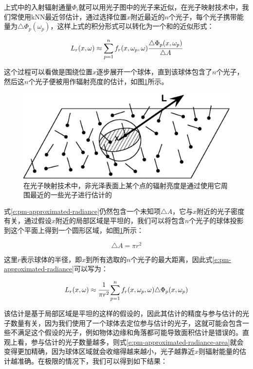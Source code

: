 上式中的入射辐射通量$\Phi_i$就可以用光子图中的光子来近似，在光子映射技术中，我们常使用kNN最近邻估计，通过选择位置$x$附近最近的$n$个光子，每个光子携带能量为$\triangle\Phi_p({\omega_p})$，这样上式的积分形式可以转化为一个和的近似形式：

\begin{equation}\label{e:pm-approximated-radiance}
	L_r(x,{\omega})\approx \sum^{n}_{p=1}f_r(x,{\omega}_p,{\omega}) \cfrac{\triangle\Phi_p(x,{\omega}_p)}{\triangle A}
\end{equation}

这个过程可以看做是围绕位置$x$逐步展开一个球体，直到该球体包含了$n$个光子，然后这$n$个光子便被用作辐射亮度的估计，如图\ref{f:pm-sphere-estimate}所示。

\begin{figure}
\sidecaption
	\includegraphics[width=.5\textwidth]{figures/pm/radiance-estimate}
	\caption{在光子映射技术中，非光泽表面上某个点的辐射亮度是通过使用它周围最近的一些光子进行估计的}
	\label{f:pm-sphere-estimate}
\end{figure}

式\ref{e:pm-approximated-radiance}仍然包含一个未知项$\triangle A$，它与$x$附近的光子密度有关，通过假设$x$附近的局部区域是平坦的，我们可以将包含$n$个光子的球体投影到这个平面上得到一个圆形区域，如图\ref{f:pm-sphere-estimate}所示：

\begin{equation}
	\triangle A=\pi r^{2}
\end{equation}

\noindent 这里$r$表示球体的半径，即$x$到所有选取的$n$个光子的最大距离，因此式\ref{e:pm-approximated-radiance}可以写为：

\begin{equation}\label{e:pm-approximated-radiance-area}
	L_r(x,{\omega})\approx  \cfrac{1}{\pi r^{2}}\sum^{n}_{p=1}f_r(x,{\omega}_p,{\omega})\triangle\Phi_p(x,{\omega}_p)
\end{equation}
 
该估计是基于局部区域是平坦的这样的假设的，因此其估计的精度与参与估计的光子数量有关，因为我们使用了一个球体去定位参与估计的光子，这就可能会包含一些不满足这个假设的光子，例如物体边缘和角落都可能导致面积估计是错误的。直观上看，参与估计的光子数量越多，则式\ref{e:pm-approximated-radiance-area}就会变得更加精确，因为球体区域就会收缩得越来越小，光子越靠近$x$则辐射能量的估计越准确。在极限的情况下，我们可以得到如下结果： 

